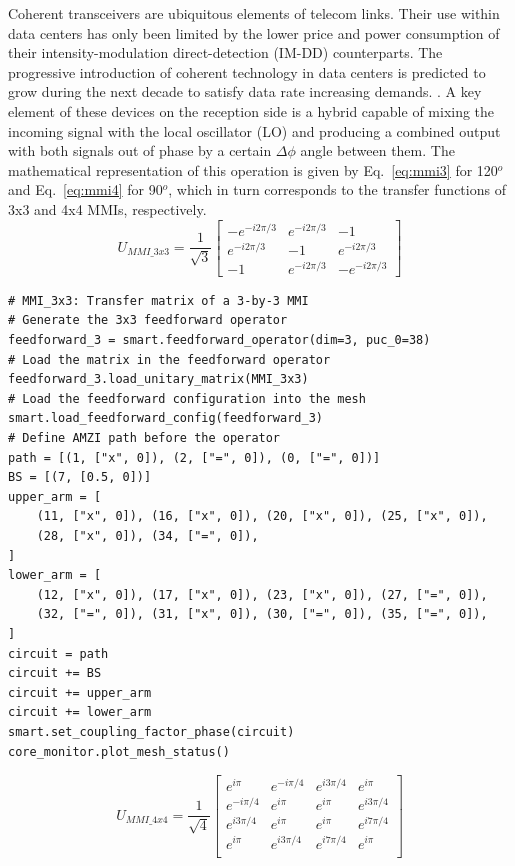 Coherent transceivers are ubiquitous elements of telecom links.
Their use within data centers has only been limited by the lower price and power consumption of their intensity-modulation direct-detection (IM-DD) counterparts.
The progressive introduction of coherent technology in data centers is predicted to grow during the next decade to satisfy data rate increasing demands.
\cite{maharry_first_2022}.
A key element of these devices on the reception side is a hybrid capable of mixing the incoming signal with the local oscillator (LO) and producing a combined output with both signals out of phase by a certain $\Delta\phi$ angle between them.
The mathematical representation of this operation is given by Eq.~\eqref{eq:mmi3} for 120$^o$ and Eq.~\eqref{eq:mmi4} for 90$^o$, which in turn corresponds to the transfer functions of 3x3 and 4x4 MMIs, respectively.
\begin{equation}\label{eq:mmi3}
	U_{MMI\_3x3} = \frac{1}{\sqrt{3}}
	\begin{bmatrix}
		-e^{-i2\pi/3} & e^{-i2\pi/3} & -1             \\
		e^{-i2\pi/3}  & -1           & e^{-i2\pi/3}   \\
		-1            & e^{-i2\pi/3} & - e^{-i2\pi/3}
	\end{bmatrix}
\end{equation}

\begin{lstlisting}[caption={Implementation of a 120$^o$ hybrid using a Feedforward operator},
label={lst:ch4-120-hybrid}]
# MMI_3x3: Transfer matrix of a 3-by-3 MMI
# Generate the 3x3 feedforward operator
feedforward_3 = smart.feedforward_operator(dim=3, puc_0=38)
# Load the matrix in the feedforward operator
feedforward_3.load_unitary_matrix(MMI_3x3)
# Load the feedforward configuration into the mesh
smart.load_feedforward_config(feedforward_3)	
# Define AMZI path before the operator
path = [(1, ["x", 0]), (2, ["=", 0]), (0, ["=", 0])]
BS = [(7, [0.5, 0])]
upper_arm = [
    (11, ["x", 0]), (16, ["x", 0]), (20, ["x", 0]), (25, ["x", 0]),
    (28, ["x", 0]), (34, ["=", 0]),
]
lower_arm = [
    (12, ["x", 0]), (17, ["x", 0]), (23, ["x", 0]), (27, ["=", 0]), 
    (32, ["=", 0]), (31, ["x", 0]), (30, ["=", 0]), (35, ["=", 0]),
]
circuit = path
circuit += BS
circuit += upper_arm
circuit += lower_arm
smart.set_coupling_factor_phase(circuit)
core_monitor.plot_mesh_status()
\end{lstlisting}

\begin{equation}\label{eq:mmi4}
	U_{MMI\_4x4} = \frac{1}{\sqrt{4}}
	\begin{bmatrix}
		e^{i\pi}    & e^{-i\pi/4} & e^{i3\pi/4} & e^{i\pi}    \\
		e^{-i\pi/4} & e^{i\pi}    & e^{i\pi}    & e^{i3\pi/4} \\
		e^{i3\pi/4} & e^{i\pi}    & e^{i\pi}    & e^{i7\pi/4} \\
		e^{i\pi}    & e^{i3\pi/4} & e^{i7\pi/4} & e^{i\pi}    \\
	\end{bmatrix}
\end{equation}

